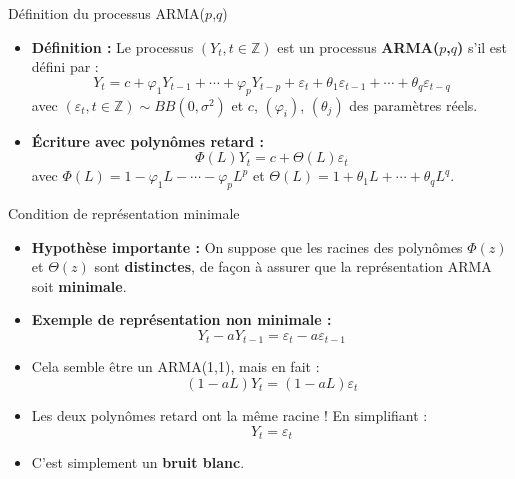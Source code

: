 \documentclass[11pt,aspectratio=169]{beamer}
\newcommand{\Z}{\mathbb{Z}}
\begin{document}
\begin{frame}{Définition du processus ARMA($p$,$q$)}

\begin{itemize}

\item \textbf{Définition :} Le processus $(Y_t, t \in \Z)$ est un processus \textbf{ARMA($p$,$q$)} s'il est défini par :
\[
Y_t = c + \varphi_1 Y_{t-1} + \cdots + \varphi_p Y_{t-p} + \varepsilon_t + \theta_1 \varepsilon_{t-1} + \cdots + \theta_q \varepsilon_{t-q}
\]
avec $(\varepsilon_t, t \in \Z) \sim BB(0, \sigma^2)$ et $c$, $(\varphi_i)$, $(\theta_j)$ des paramètres réels.\newline

\item \textbf{Écriture avec polynômes retard :}
\[
\Phi(L) Y_t = c + \Theta(L) \varepsilon_t
\]
avec $\Phi(L) = 1 - \varphi_1 L - \cdots - \varphi_p L^p$ et $\Theta(L) = 1 + \theta_1 L + \cdots + \theta_q L^q$.

\end{itemize}
\end{frame}

\begin{frame}{Condition de représentation minimale}

\begin{itemize}

\item \textbf{Hypothèse importante :} On suppose que les racines des polynômes $\Phi(z)$ et $\Theta(z)$ sont \textbf{distinctes}, de façon à assurer que la représentation ARMA soit \textbf{minimale}.\newline

\item \textbf{Exemple de représentation non minimale :}
\[
Y_t - a Y_{t-1} = \varepsilon_t - a \varepsilon_{t-1}
\]

\item Cela semble être un ARMA(1,1), mais en fait :
\[
(1 - aL) Y_t = (1 - aL) \varepsilon_t
\]

\item Les deux polynômes retard ont la même racine ! En simplifiant :
\[
Y_t = \varepsilon_t
\]

\item C'est simplement un \textbf{bruit blanc}.

\end{itemize}
\end{frame}
\end{document}
